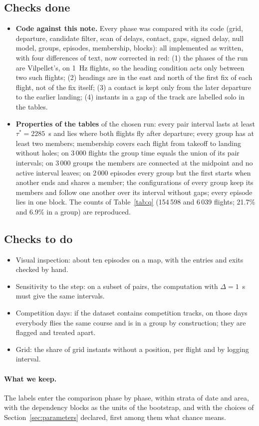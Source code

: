 \subsection{Checks done}\label{sec:checks-done}

\begin{itemize}
  \item \textbf{Code against this note.} Every phase was compared with its code (grid, departure,
        candidate filter, scan of delays, contact, gaps, signed delay, null model, groups,
        episodes, membership, blocks): all implemented as written, with four differences of text,
        now corrected in red: (1) the phases of the run are Vilpellet's, on 1~Hz flights, so the
        heading condition acts only between two such flights; (2) headings are in the east and
        north of the first fix of each flight, not of the fix itself; (3) a contact is kept only
        from the later departure to the earlier landing; (4) instants in a gap of the track are
        labelled solo in the tables.
  \item \textbf{Properties of the tables} of the chosen run: every pair interval lasts at least
        $\tau^*=2285$~s and lies where both flights fly after departure; every group has at
        least two members; membership covers each flight from takeoff to landing without holes; on
        3\,000 flights the group time equals the union of its pair intervals; on 3\,000
        groups the members are connected at the midpoint and no active interval leaves; on
        2\,000 episodes every group but the first starts when another ends and shares a
        member; the configurations of every group keep its members and follow one another over
        its interval without gaps; every episode lies in one block. The counts of
        Table~\ref{tab:q} (154\,598 and 6\,039 flights; 21.7\% and 6.9\% in a group) are
        reproduced.
\end{itemize}

\subsection{Checks to do}\label{sec:checks}

\begin{itemize}
  \item Visual inspection: about ten episodes on a map, with the entries and exits checked by hand.
  \item Sensitivity to the step: on a subset of pairs, the computation with $\Delta=1$~s must give
        the same intervals.
  \item Competition days: if the dataset contains competition tracks, on those days everybody flies
        the same course and is in a group by construction; they are flagged and treated apart.
  \item Grid: the share of grid instants without a position, per flight and by logging interval.
\end{itemize}

\paragraph{What we keep.} The labels enter the comparison phase by phase, within strata of date and
area, with the dependency blocks as the units of the bootstrap, and with the choices of
Section~\ref{sec:parameters} declared, first among them what chance means.
